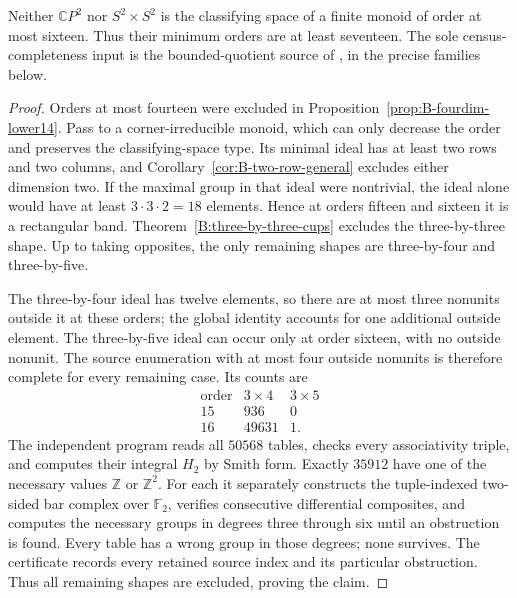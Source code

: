 \begin{proposition}
\label{B:fourdim-lower17}
Neither $\mathbb CP^2$ nor $S^2\times S^2$ is the classifying space
of a finite monoid of order at most sixteen.  Thus their minimum
orders are at least seventeen.  The sole census-completeness
input is the bounded-quotient source of
\cite{SweeneyEnumeration2026B}, in the precise families below.
\end{proposition}
\begin{proof}
Orders at most fourteen were excluded in
Proposition~\ref{prop:B-fourdim-lower14}.  Pass to a
corner-irreducible monoid, which can only decrease the order and
preserves the classifying-space type.  Its minimal ideal has at
least two rows and two columns, and
Corollary~\ref{cor:B-two-row-general} excludes either dimension two.
If the maximal group in that ideal were nontrivial, the ideal alone
would have at least $3\cdot3\cdot2=18$ elements.  Hence at orders
fifteen and sixteen it is a rectangular band.  Theorem~\ref{B:three-by-three-cups}
excludes the three-by-three shape.  Up to taking opposites, the
only remaining shapes are three-by-four and three-by-five.

The three-by-four ideal has twelve elements, so there are at most
three nonunits outside it at these orders; the global identity
accounts for one additional outside element.  The three-by-five
ideal can occur only at order sixteen, with no outside nonunit.
The source enumeration with at most four outside nonunits is
therefore complete for every remaining case.  Its counts are
\[
\begin{array}{c|r|r}
\text{order}&3\times4&3\times5\\\hline
15&936&0\\
16&49631&1.
\end{array}
\]
The independent program
reads all $50568$ tables, checks every associativity triple, and
computes their integral $H_2$ by Smith form.  Exactly $35912$
have one of the necessary values $\mathbb Z$ or $\mathbb Z^2$.
For each it separately constructs the tuple-indexed two-sided bar
complex over $\mathbb F_2$, verifies consecutive differential
composites, and computes the necessary groups in degrees three
through six until an obstruction is found.  Every table has a
wrong group in those degrees; none survives.  The certificate
records every retained source index and its particular obstruction.
Thus all remaining shapes are excluded, proving the claim.
\end{proof}
